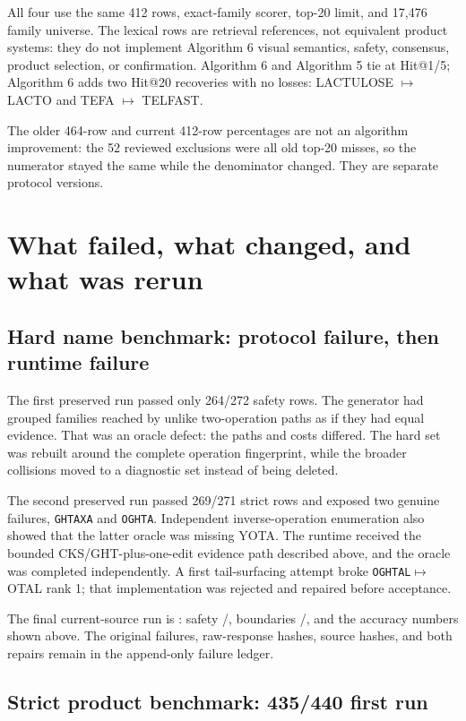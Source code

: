 \documentclass[10pt,a4paper]{article}
\newcommand{\observed}[1]{\texttt{#1}}
\begin{document}
All four use the same 412 rows, exact-family scorer, top-20 limit, and 17,476
family universe. The lexical rows are retrieval references, not equivalent
product systems: they do not implement Algorithm 6 visual semantics, safety,
consensus, product selection, or confirmation. Algorithm 6 and Algorithm 5
tie at Hit@1/5; Algorithm 6 adds two Hit@20 recoveries with no losses:
LACTULOSE $\mapsto$ LACTO and TEFA $\mapsto$ TELFAST.

The older 464-row and current 412-row percentages are not an algorithm improvement:
the 52 reviewed exclusions were all old top-20 misses, so the numerator stayed
the same while the denominator changed. They are separate protocol versions.

\section{What failed, what changed, and what was rerun}

\subsection{Hard name benchmark: protocol failure, then runtime failure}

The first preserved run passed only 264/272 safety rows. The generator had
grouped families reached by unlike two-operation paths as if they had equal
evidence. That was an oracle defect: the paths and costs differed. The hard
set was rebuilt around the complete operation fingerprint, while the broader
collisions moved to a diagnostic set instead of being deleted.

The second preserved run passed 269/271 strict rows and exposed two genuine
failures, \observed{GHTAXA} and \observed{OGHTA}. Independent inverse-operation
enumeration also showed that the latter oracle was missing YOTA. The runtime
received the bounded CKS/GHT-plus-one-edit evidence path described above, and
the oracle was completed independently. A first tail-surfacing attempt broke
\observed{OGHTAL}$\mapsto$OTAL rank 1; that implementation was rejected and
repaired before acceptance.

The final current-source run is \texttt{\HardRunId}: safety
\HardSafetyPass/\HardSafetyCases, boundaries
\HardBoundaryPass/\HardBoundaryCases, and the accuracy numbers shown above.
The original failures, raw-response hashes, source hashes, and both repairs
remain in the append-only failure ledger.

\subsection{Strict product benchmark: 435/440 first run}
\end{document}
